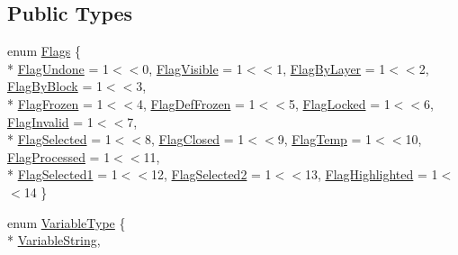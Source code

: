 \subsection*{Public Types}
\begin{DoxyCompactItemize}
\item 
enum \hyperlink{class_r_s2_a44c2db4b2ed0d533716a5266abafeeca}{Flags} \{ \\*
\hyperlink{class_r_s2_a44c2db4b2ed0d533716a5266abafeecaa9ff48e6f3b998828e8d11a1cd206afc0}{Flag\-Undone} = 1$<$$<$0, 
\hyperlink{class_r_s2_a44c2db4b2ed0d533716a5266abafeecaab4264f781d78cf1b2df258012ade9db1}{Flag\-Visible} = 1$<$$<$1, 
\hyperlink{class_r_s2_a44c2db4b2ed0d533716a5266abafeecaa5695d8e7e282ccafc07f18257da4f78b}{Flag\-By\-Layer} = 1$<$$<$2, 
\hyperlink{class_r_s2_a44c2db4b2ed0d533716a5266abafeecaafccfa9b8d47c85e8713a886c410c0619}{Flag\-By\-Block} = 1$<$$<$3, 
\\*
\hyperlink{class_r_s2_a44c2db4b2ed0d533716a5266abafeecaabc228081c0cd60b864f8c04b34968e2b}{Flag\-Frozen} = 1$<$$<$4, 
\hyperlink{class_r_s2_a44c2db4b2ed0d533716a5266abafeecaaabfd152e3a83c8b999e443e173cf7467}{Flag\-Def\-Frozen} = 1$<$$<$5, 
\hyperlink{class_r_s2_a44c2db4b2ed0d533716a5266abafeecaa0f6159550603001fce21af07b4553ad6}{Flag\-Locked} = 1$<$$<$6, 
\hyperlink{class_r_s2_a44c2db4b2ed0d533716a5266abafeecaa818c995d3fba5a5503def5a538f8abe4}{Flag\-Invalid} = 1$<$$<$7, 
\\*
\hyperlink{class_r_s2_a44c2db4b2ed0d533716a5266abafeecaaaf72e9b8b969dd44722c75afd1afc5de}{Flag\-Selected} = 1$<$$<$8, 
\hyperlink{class_r_s2_a44c2db4b2ed0d533716a5266abafeecaa40d93a1e22967fac3291d8886155fafc}{Flag\-Closed} = 1$<$$<$9, 
\hyperlink{class_r_s2_a44c2db4b2ed0d533716a5266abafeecaab25c508640c79e30edb1d720043c5d51}{Flag\-Temp} = 1$<$$<$10, 
\hyperlink{class_r_s2_a44c2db4b2ed0d533716a5266abafeecaa7c9021e11cd578ebc4079b0479783b9e}{Flag\-Processed} = 1$<$$<$11, 
\\*
\hyperlink{class_r_s2_a44c2db4b2ed0d533716a5266abafeecaad067bf696af8200ed6940950b5bb441f}{Flag\-Selected1} = 1$<$$<$12, 
\hyperlink{class_r_s2_a44c2db4b2ed0d533716a5266abafeecaadfae35f50ee6bac880b871226017babf}{Flag\-Selected2} = 1$<$$<$13, 
\hyperlink{class_r_s2_a44c2db4b2ed0d533716a5266abafeecaa342deed7b530740efa6f5db89137c50d}{Flag\-Highlighted} = 1$<$$<$14
 \}
\item 
enum \hyperlink{class_r_s2_af1c96c2254f823f3836e8839482870d7}{Variable\-Type} \{ \\*
\hyperlink{class_r_s2_af1c96c2254f823f3836e8839482870d7ab16cddce9f025c2680ee3ca9c37e4d73}{Variable\-String}, 
$$
\end{DoxyCompactItemize}
